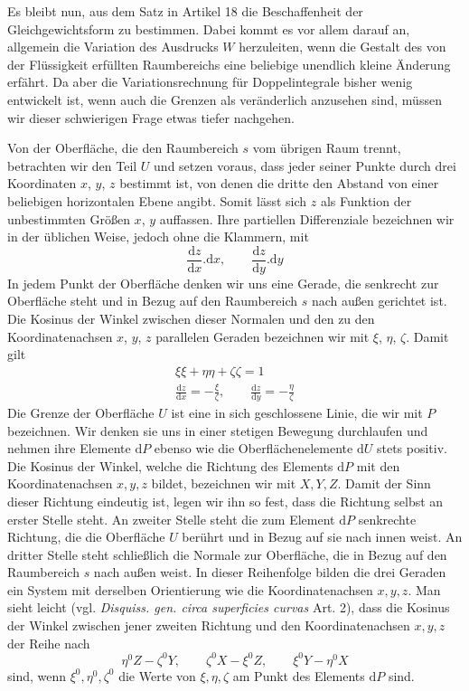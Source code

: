 Es bleibt nun, aus dem Satz in Artikel 18 die Beschaffenheit der Gleichgewichtsform zu bestimmen. Dabei kommt es vor allem darauf an, allgemein die Variation des Ausdrucks $W$ herzuleiten, wenn die Gestalt des von der Flüssigkeit erfüllten Raumbereichs eine beliebige unendlich kleine Änderung erfährt. Da aber die Variationsrechnung für Doppelintegrale bisher wenig entwickelt ist, wenn auch die Grenzen als veränderlich anzusehen sind, müssen wir dieser schwierigen Frage etwas tiefer nachgehen.

Von der Oberfläche, die den Raumbereich $s$ vom übrigen Raum trennt, betrachten wir den Teil $U$ und setzen voraus, dass jeder seiner Punkte durch drei Koordinaten $x$, $y$, $z$ bestimmt ist, von denen die dritte den Abstand von einer beliebigen horizontalen Ebene angibt. Somit lässt sich $z$ als Funktion der unbestimmten Größen $x$, $y$ auffassen. Ihre partiellen Differenziale bezeichnen wir in der üblichen Weise, jedoch ohne die Klammern, mit
\[
\frac{\mathrm{d}z}{\mathrm{d}x}.\mathrm{d}x,\qquad\frac{\mathrm{d}z}{\mathrm{d}y}.\mathrm{d}y
\]
In jedem Punkt der Oberfläche denken wir uns eine Gerade, die senkrecht zur Oberfläche steht und in Bezug auf den Raumbereich $s$ nach außen gerichtet ist. Die Kosinus der Winkel zwischen dieser Normalen und den zu den Koordinatenachsen $x$, $y$, $z$ parallelen Geraden bezeichnen wir mit $\xi$, $\eta$, $\zeta$. Damit gilt
\[
\begin{gathered}
\xi\xi+\eta\eta+\zeta\zeta=1\\
\frac{\mathrm{d}z}{\mathrm{d}x}=-\frac{\xi}{\zeta},\qquad\frac{\mathrm{d}z}{\mathrm{d}y}=-\frac{\eta}{\zeta}
\end{gathered}
\]
Die Grenze der Oberfläche $U$ ist eine in sich geschlossene Linie, die wir mit $P$ bezeichnen. Wir denken sie uns in einer stetigen Bewegung durchlaufen und nehmen ihre Elemente $\mathrm{d}P$ ebenso wie die Oberflächenelemente $\mathrm{d}U$ stets positiv. Die Kosinus der Winkel, welche die Richtung des Elements $\mathrm{d}P$ mit den Koordinatenachsen $x,y,z$ bildet, bezeichnen wir mit $X,Y,Z$. Damit der Sinn dieser Richtung eindeutig ist, legen wir ihn so fest, dass die Richtung selbst an erster Stelle steht. An zweiter Stelle steht die zum Element $\mathrm{d}P$ senkrechte Richtung, die die Oberfläche $U$ berührt und in Bezug auf sie nach innen weist. An dritter Stelle steht schließlich die Normale zur Oberfläche, die in Bezug auf den Raumbereich $s$ nach außen weist. In dieser Reihenfolge bilden die drei Geraden ein System mit derselben Orientierung wie die Koordinatenachsen $x,y,z$. Man sieht leicht (vgl. \textit{Disquiss. gen. circa superficies curvas} Art. 2), dass die Kosinus der Winkel zwischen jener zweiten Richtung und den Koordinatenachsen $x,y,z$ der Reihe nach
\[
\eta^0Z-\zeta^0Y,\qquad \zeta^0X-\xi^0Z,\qquad \xi^0Y-\eta^0X
\]
sind, wenn $\xi^0,\eta^0,\zeta^0$ die Werte von $\xi,\eta,\zeta$ am Punkt des Elements $\mathrm{d}P$ sind.

